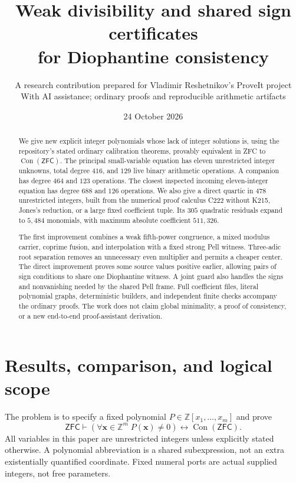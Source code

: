 \documentclass[11pt]{article}
\title{Weak divisibility and shared sign certificates\\for Diophantine consistency}
\author{A research contribution prepared for Vladimir Reshetnikov's ProveIt project\\\small With AI assistance; ordinary proofs and reproducible arithmetic artifacts}
\date{24 October 2026}
\newcommand{\Z}{\mathbb Z}
\newcommand{\Con}{\operatorname{Con}}
\newcommand{\ZFC}{\mathsf{ZFC}}
\theoremstyle{definition}
\theoremstyle{remark}
\begin{document}
\maketitle
\begin{abstract}
We give new explicit integer polynomials whose lack of integer solutions
is, using the repository's stated ordinary calibration theorems, provably
equivalent in ZFC to $\Con(\ZFC)$. The principal small-variable equation
has eleven unrestricted integer unknowns, total degree $416$, and $129$
live binary arithmetic operations. A companion has degree $464$ and
$123$ operations. The closest inspected incoming eleven-integer equation
has degree $688$ and $126$ operations. We also give a direct quartic in
$478$ unrestricted integers, built from the numerical proof calculus
C222 without K215, Jones's reduction, or a large fixed coefficient tuple.
Its $305$ quadratic residuals expand to $5{,}484$ monomials, with maximum
absolute coefficient $511{,}326$.

The first improvement combines a weak fifth-power congruence, a mixed
modulus carrier, coprime fusion, and interpolation with a fixed strong
Pell witness. Three-adic root separation removes an unnecessary even
multiplier and permits a cheaper center. The direct improvement proves
some source values positive earlier, allowing pairs of sign conditions
to share one Diophantine witness. A joint guard also handles the signs
and nonvanishing needed by the shared Pell frame. Full coefficient files,
literal polynomial graphs, deterministic builders, and independent
finite checks accompany the ordinary proofs. The work does not claim
global minimality, a proof of consistency, or a new end-to-end
proof-assistant derivation.
\end{abstract}

\tableofcontents
\newpage

\section{Results, comparison, and logical scope}
\label{sec:results}

The problem is to specify a fixed polynomial $P\in\Z[x_1,\ldots,x_m]$
and prove
\begin{equation}\label{eq:goal}
 \ZFC\vdash
 \left(\forall\mathbf x\in\Z^m\; P(\mathbf x)\ne0\right)
 \longleftrightarrow\Con(\ZFC).
\end{equation}
All variables in this paper are unrestricted integers unless explicitly
stated otherwise. A polynomial abbreviation is a shared subexpression,
not an extra existentially quantified coordinate. Fixed numeral ports
are actual supplied integers, not free parameters.
\end{document}
